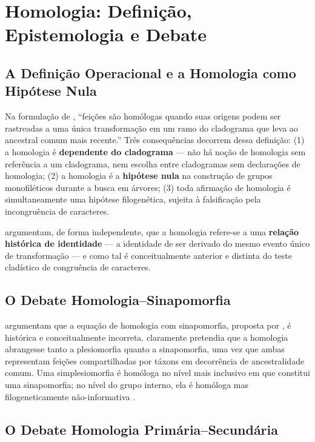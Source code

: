 \section{Homologia: Definição, Epistemologia e Debate}
\label{sec:homologia}

\subsection{A Definição Operacional e a Homologia como Hipótese Nula}

Na formulação de \textcite[p.~10]{wheeleretal2006}, ``feições são homólogas quando suas origens podem ser rastreadas a uma única transformação em um ramo do cladograma que leva ao ancestral comum mais recente.'' Três consequências decorrem dessa definição: (1) a homologia é \textbf{dependente do cladograma} --- não há noção de homologia sem referência a um cladograma, nem escolha entre cladogramas sem declarações de homologia; (2) a homologia é a \textbf{hipótese nula} na construção de grupos monofiléticos durante a busca em árvores; (3) toda afirmação de homologia é simultaneamente uma hipótese filogenética, sujeita à falsificação pela incongruência de caracteres.

\textcite{grant2004ts} argumentam, de forma independente, que a homologia refere-se a uma \textbf{relação histórica de identidade} --- a identidade de ser derivado do mesmo evento único de transformação --- e como tal é conceitualmente anterior e distinta do teste cladístico de congruência de caracteres.

\subsection{O Debate Homologia--Sinapomorfia}

\textcite{nixon2012} argumentam que a equação de homologia com sinapomorfia, proposta por \textcite{patterson1982}, é histórica e conceitualmente incorreta. \textcite{hennig1966} claramente pretendia que a homologia abrangesse tanto a plesiomorfia quanto a sinapomorfia, uma vez que ambas representam feições compartilhadas por táxons em decorrência de ancestralidade comum. Uma simplesiomorfia é homóloga no nível mais inclusivo em que constitui uma sinapomorfia; no nível do grupo interno, ela é homóloga mas filogeneticamente não-informativa \parencite{nixon2012}.

\subsection{O Debate Homologia Primária--Secundária}

